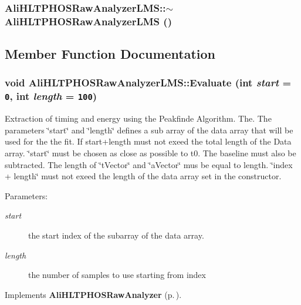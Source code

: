 \subsubsection{\setlength{\rightskip}{0pt plus 5cm}Ali\-HLTPHOSRaw\-Analyzer\-LMS::$\sim${\bf Ali\-HLTPHOSRaw\-Analyzer\-LMS} ()\hspace{0.3cm}{\tt  [virtual]}}\label{classAliHLTPHOSRawAnalyzerLMS_a4}




\subsection{Member Function Documentation}
\subsubsection{\setlength{\rightskip}{0pt plus 5cm}void Ali\-HLTPHOSRaw\-Analyzer\-LMS::Evaluate (int {\em start} = {\tt 0}, int {\em length} = {\tt 100})\hspace{0.3cm}{\tt  [virtual]}}\label{classAliHLTPHOSRawAnalyzerLMS_a5}


Extraction of timing and energy using the Peakfinde Algorithm. The. The parameters \char`\"{}start\char`\"{} and \char`\"{}length\char`\"{} defines a sub array of the data array that will be used for the the fit. If start+length must not exeed the total length of the Data array. \char`\"{}start\char`\"{} must be chosen as close as possible to t0. The baseline must also be subtracted. The length of \char`\"{}t\-Vector\char`\"{} and \char`\"{}a\-Vector\char`\"{} mus be equal to length. \char`\"{}index + length\char`\"{} must not exeed the length of the data array set in the constructor. \begin{Desc}
\item[Parameters:]
\begin{description}
\item[{\em start}]the start index of the subarray of the data array. \item[{\em length}]the number of samples to use starting from index \end{description}
\end{Desc}


Implements {\bf Ali\-HLTPHOSRaw\-Analyzer} {\rm (p.\,\pageref{classAliHLTPHOSRawAnalyzer_a14})}.
